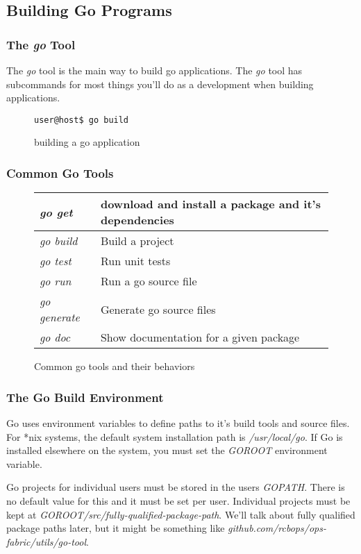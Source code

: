 \documentclass{beamer}
\begin{document}
\subsection{Building Go Programs}

\begin{frame}[fragile]
  \frametitle{The \emph{go} Tool}
  The \emph{go} tool is the main way to build go applications. The
  \emph{go} tool has subcommands for most things you'll do as a
  development when building applications.

  \begin{figure}
\begin{lstlisting}
user@host$ go build
\end{lstlisting}
    \caption{building a go application}
  \end{figure}
\end{frame}

\begin{frame}[fragile]
  \frametitle{Common Go Tools}
  \begin{figure}
  \begin{tabular}{|l|p{3in}|}
    \hline
    \emph{go get} & download and install a package and it's dependencies \\
    \hline
    \emph{go build} & Build a project \\
    \hline
    \emph{go test} & Run unit tests \\
    \hline
    \emph{go run} & Run a go source file \\
    \hline
    \emph{go generate} & Generate go source files \\
    \hline
    \emph{go doc} & Show documentation for a given package \\
    \hline
  \end{tabular}
  \caption{Common go tools and their behaviors}
  \end{figure}
\end{frame}

\begin{frame}
  \frametitle{The Go Build Environment}
  Go uses environment variables to define paths to it's build tools
  and source files.  For *nix systems, the default system installation
  path is \emph{/usr/local/go}.  If Go is installed elsewhere on the
  system, you must set the \emph{GOROOT} environment variable.

  Go projects for individual users must be stored in the users
  \emph{GOPATH}.  There is no default value for this and it must be
  set per user.  Individual projects must be kept at
  \emph{GOROOT/src/fully-qualified-package-path}.  We'll talk about
  fully qualified package paths later, but it might be something like
  \emph{github.com/rcbops/ops-fabric/utils/go-tool}.
\end{frame}
\end{document}
